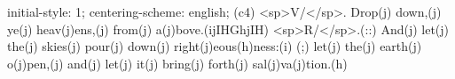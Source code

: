 initial-style: 1;
centering-scheme: english;
(c4) <sp>V/</sp>. Drop(j) down,(j) ye(j) heav(j)ens,(j) from(j) a(j)bove.(ijIHGhjIH) <sp>R/</sp>.(::)
And(j) let(j) the(j) skies(j) pour(j) down(j) right(j)eous(h)ness:(i) (;) let(j) the(j) earth(j) o(j)pen,(j) and(j) let(j) it(j) bring(j) forth(j) sal(j)va(j)tion.(h)
